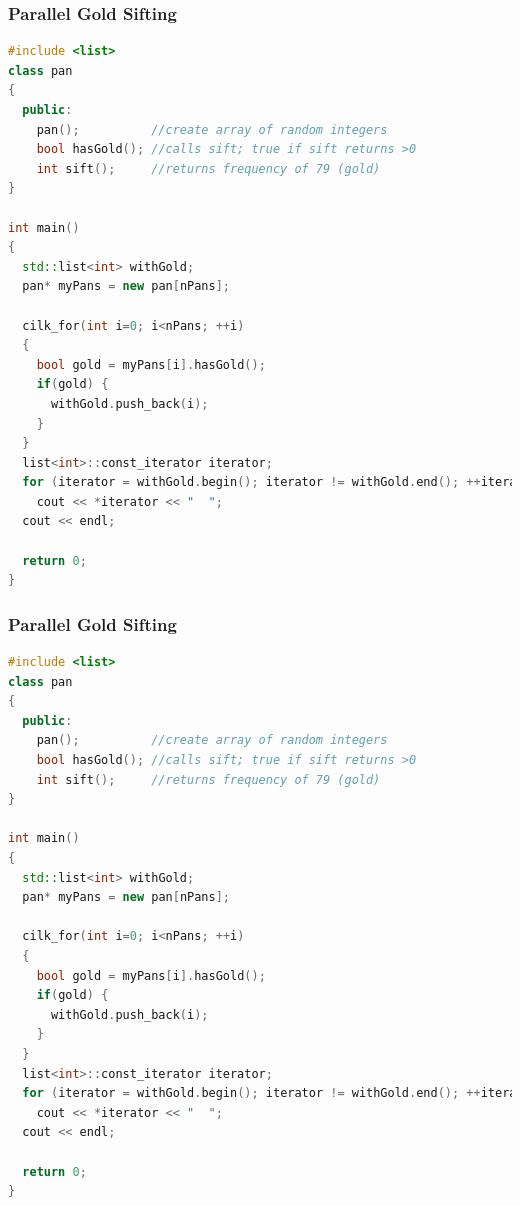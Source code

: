 \documentclass[fleqn,xcolor=table,10pt,final]{beamer}
\begin{document}
\begin{frame}[fragile]
  \frametitle{Parallel Gold Sifting}
  \begin{lstlisting}[language=C++,basicstyle=\scriptsize]
#include <list>
class pan
{
  public:
    pan();          //create array of random integers
    bool hasGold(); //calls sift; true if sift returns >0
    int sift();     //returns frequency of 79 (gold)
}

int main()
{
  std::list<int> withGold;
  pan* myPans = new pan[nPans];

  cilk_for(int i=0; i<nPans; ++i)
  {
    bool gold = myPans[i].hasGold();
    if(gold) {
      withGold.push_back(i);
    }
  }
  list<int>::const_iterator iterator;
  for (iterator = withGold.begin(); iterator != withGold.end(); ++iterator)
    cout << *iterator << "  ";
  cout << endl;

  return 0;
}
  \end{lstlisting}
\end{frame}
\begin{frame}[fragile]
  \frametitle{Parallel Gold Sifting}
  \begin{lstlisting}[language=C++,basicstyle=\scriptsize]
#include <list>
class pan
{
  public:
    pan();          //create array of random integers
    bool hasGold(); //calls sift; true if sift returns >0
    int sift();     //returns frequency of 79 (gold)
}

int main()
{
  std::list<int> withGold;
  pan* myPans = new pan[nPans];

  cilk_for(int i=0; i<nPans; ++i)
  {
    bool gold = myPans[i].hasGold();
    if(gold) {
      withGold.push_back(i);
    }
  }
  list<int>::const_iterator iterator;
  for (iterator = withGold.begin(); iterator != withGold.end(); ++iterator)
    cout << *iterator << "  ";
  cout << endl;

  return 0;
}
  \end{lstlisting}
\end{frame}
\end{document}
